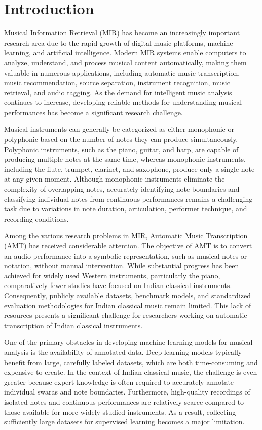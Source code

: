\chapter{Introduction}
\label{ch:introduction}

Musical Information Retrieval (MIR) has become an increasingly important research area due to the rapid growth of digital music platforms, machine learning, and artificial intelligence. Modern MIR systems enable computers to analyze, understand, and process musical content automatically, making them valuable in numerous applications, including automatic music transcription, music recommendation, source separation, instrument recognition, music retrieval, and audio tagging. As the demand for intelligent music analysis continues to increase, developing reliable methods for understanding musical performances has become a significant research challenge.

Musical instruments can generally be categorized as either monophonic or polyphonic based on the number of notes they can produce simultaneously. Polyphonic instruments, such as the piano, guitar, and harp, are capable of producing multiple notes at the same time, whereas monophonic instruments, including the flute, trumpet, clarinet, and saxophone, produce only a single note at any given moment. Although monophonic instruments eliminate the complexity of overlapping notes, accurately identifying note boundaries and classifying individual notes from continuous performances remains a challenging task due to variations in note duration, articulation, performer technique, and recording conditions.

Among the various research problems in MIR, Automatic Music Transcription (AMT) has received considerable attention. The objective of AMT is to convert an audio performance into a symbolic representation, such as musical notes or notation, without manual intervention. While substantial progress has been achieved for widely used Western instruments, particularly the piano, comparatively fewer studies have focused on Indian classical instruments. Consequently, publicly available datasets, benchmark models, and standardized evaluation methodologies for Indian classical music remain limited. This lack of resources presents a significant challenge for researchers working on automatic transcription of Indian classical instruments.

One of the primary obstacles in developing machine learning models for musical analysis is the availability of annotated data. Deep learning models typically benefit from large, carefully labeled datasets, which are both time-consuming and expensive to create. In the context of Indian classical music, the challenge is even greater because expert knowledge is often required to accurately annotate individual swaras and note boundaries. Furthermore, high-quality recordings of isolated notes and continuous performances are relatively scarce compared to those available for more widely studied instruments. As a result, collecting sufficiently large datasets for supervised learning becomes a major limitation.


